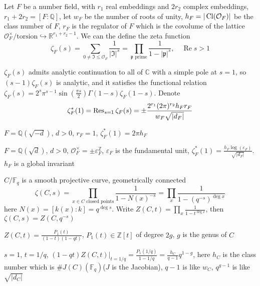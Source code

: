 Let $F$ be a number field, with $r_1$ real embeddings and $2r_2$ complex embeddings, $r_1+2r_2=[F:\mathbb Q]$, let $w_F$ be the number of roots of unity, $h_F=|\operatorname{Cl}(\mathcal O_F)|$ be the class number of $F$, $r_F$ is the regulator of $F$ which is the covolume of the lattice $\mathcal O_F^\times/\text{torsion}\hookrightarrow\mathbb R^{r_1+r_2-1}$. We can the define the zeta function
\[
\zeta_F(s)=\sum_{0\neq\mathfrak I\leq\mathcal O_F}\frac{1}{|\mathfrak I|^s}=\prod_{\mathfrak p\text{ prime}}\frac{1}{1-|\mathfrak p|^s},\quad \operatorname{Re}s>1
\]

\begin{theorem}
$\zeta_F(s)$ admits analytic continuation to all of $\mathbb C$ with a simple pole at $s=1$, so $(s-1)\zeta_F(s)$ is analytic, and it satisfies the functional relation $\zeta_F(s)=2^s\pi^{s-1}\sin(\frac{\pi s}{2})\Gamma(1-s)\zeta_F(1-s)$. Denote
\[
\zeta_F^*(1)=\operatorname{Res}_{s=1}\zeta_F(s)=\pm\frac{2^{r_1}(2\pi)^{r_2}h_Fr_F}{w_F\sqrt{|d_F|}}
\]
\end{theorem}

$F=\mathbb Q(\sqrt{-d})$, $d>0$, $r_F=1$, $\zeta_F^*(1)=2\pi h_F$

$F=\mathbb Q(\sqrt{d})$, $d>0$, $\mathcal O_F^\times=\pm\varepsilon_F^{\mathbb Z}$, $\varepsilon_F$ is the fundamental unit, $\zeta_F^*(1)=\frac{h_F\log(\varepsilon_F)}{\sqrt{|d_F|}}$. $h_F$ is a global invariant

$C/\mathbb F_q$ is a smooth projective curve, geometrically connected
\[
\zeta(C,s)=\prod_{x\in C\text{ closed points}}\frac{1}{1-N(x)^{-s}}=\prod_x\frac{1}{1-(q^{-s})^{\deg x}}
\]
here $N(x)=[k(x):k]=q^{\deg s}$. Write $Z(C,t)=\prod_x\frac{1}{1-t^{\deg x}}$, then $\zeta(C,s)=Z(C,q^{-s})$

$Z(C,t)=\frac{P_1(t)}{(1-t)(1-qt)}$, $P_1(t)\in\mathbb Z[t]$ of degree $2g$, $g$ is the genus of $C$

\begin{theorem}
$s=1$, $t=1/q$, $(1-qt)Z(C,t)|_{t=1/q}=\frac{P_1(1/q)}{1-1/q}=\frac{h_C}{q-1}q^{1-g}$, here $h_C$ is the class number which is $\#J(C)(\mathbb F_q)$($J$ is the Jacobian), $q-1$ is like $w_C$, $q^{g-1}$ is like $\sqrt{|d_C|}$
\begin{center}
\end{center}
\end{theorem}

